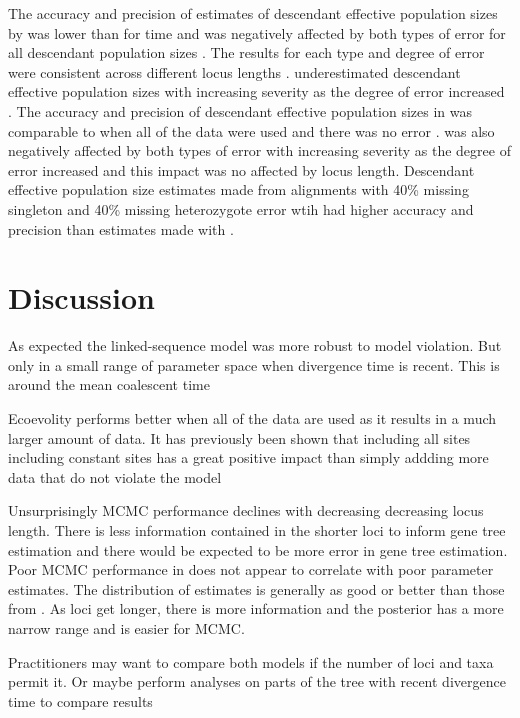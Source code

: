 The accuracy and precision of estimates of descendant effective population sizes 
by \beast was lower than for time and was negatively affected by both types
of error for all descendant population sizes \thetafigs.
The results for each type and degree of error were consistent across different 
locus lengths \thetafigs.
\beast underestimated descendant effective population sizes with increasing severity 
as the degree of error increased \thetafigs.
The accuracy and precision of descendant effective population sizes in 
\ecoevolity was comparable to \beast when all of 
the data were used and there was no error \thetafigs. 
\ecoevolity was also negatively affected
by both types of error with increasing severity as the degree of error increased
and this impact was no affected by locus length.
Descendant effective population size estimates made from alignments with 40\%
missing singleton and 40\% missing heterozygote error wtih \beast had higher
accuracy and precision than estimates made with \ecoevolity \thetafigs.   

\section{Discussion}


As expected the linked-sequence model was more robust to model violation.
But only in a small range of parameter space when divergence time is recent. This
is around the mean coalescent time



Ecoevolity performs better when all of the data are used as it results in a much larger 
amount of data. It has previously been shown that including all sites including 
constant sites has a great positive impact than simply addding more data that 
do not violate the model \citep{Oaks2018ecoevolity}


Unsurprisingly MCMC performance declines with decreasing decreasing locus length.
There is less information contained in the shorter loci to inform gene tree estimation 
and there would be expected to be more error in gene tree estimation.
Poor MCMC performance in \beast does not appear to correlate with poor parameter 
estimates. The distribution of estimates is generally as good or better than those 
from \ecoevolity. 
As loci get longer, there is more information and the posterior has a more 
narrow range and is easier for MCMC.



Practitioners may want to compare both models if the number of loci and taxa
permit it. Or maybe perform analyses on parts of the tree with recent divergence
time to compare results 

